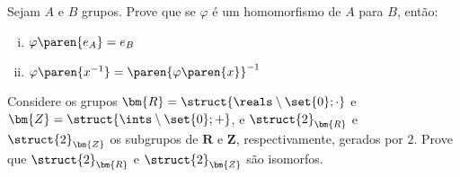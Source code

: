 \begin{exercise}
    Sejam $A$ e $B$ grupos. 
    Prove que se $\varphi$ é um homomorfismo de $A$ para $B$, então:
    \begin{enumerate}[(i)]
        \item $\varphi\paren{e_A} = e_B$
        \item $\varphi\paren{x^{-1}}= \paren{\varphi\paren{x}}^{-1}$
    \end{enumerate}
\end{exercise}

\begin{exercise}
    Considere os grupos $\bm{R} = \struct{\reals \setminus \set{0}; \cdot}$ e $\bm{Z} = \struct{\ints \setminus \set{0}; +}$,
    e $\struct{2}_{\bm{R}}$ e $\struct{2}_{\bm{Z}}$ os subgrupos de $\bm R$ e $\bm Z$, respectivamente, gerados por  $2$.
    Prove que $\struct{2}_{\bm{R}}$ e $\struct{2}_{\bm{Z}}$ são isomorfos.
\end{exercise}
